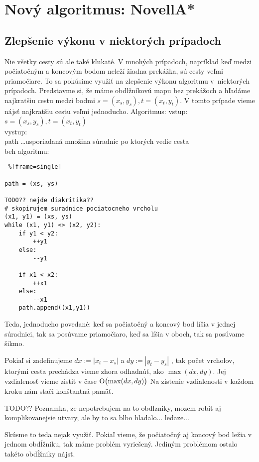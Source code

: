 \chapter{Nový algoritmus: NovellA*}

\section{Zlepšenie výkonu v niektorých prípadoch}
Nie všetky cesty sú ale také kľukaté. V mnohých prípadoch, napríklad keď medzi počiatočným a koncovým bodom neleží žiadna prekážka, 
sú cesty veľmi priamočiare. To sa pokúsime využiť na zlepšenie výkonu algoritmu v~niektorých prípadoch. 
Predstavme si, že máme obdlžníkovú mapu bez prekážoch a hľadáme najkratšiu cestu medzi bodmi $s=(x_s,y_s), t=(x_t,y_t)$.
V tomto prípade vieme nájsť najkratšiu cestu veľmi jednoducho.
Algoritmus:
vstup: \\
$s=(x_s,y_s), t=(x_t,y_t)$ \\
vystup:\\
path \dots usporiadaná množina súradníc po ktorých vedie cesta\\
beh algoritmu:\\


\lstset{language=Python}          
\begin{lstlisting} %[frame=single]  

path = (xs, ys)

TODO?? nejde diakritika??
# skopirujem suradnice pociatocneho vrcholu 
(x1, y1) = (xs, ys) 
while (x1, y1) <> (x2, y2):
	if y1 < y2:
		++y1
	else:
		--y1

	if x1 < x2:
		++x1
	else:
		--x1
	path.append((x1,y1))
\end{lstlisting}

Teda, jednoducho povedané: keď sa počiatočný a koncový bod líšia v jednej súradnici, tak sa posúvame priamočiaro,
keď sa líšia v oboch, tak sa posúvame šikmo.


Pokiaľ si zadefinujeme 
$ dx := |x_t - x_s|$ 
a
$ dy :=|y_t - y_s| $
 , tak počet vrcholov,
ktorými cesta prechádza vieme zhora odhadnúť, ako $\max(dx, dy)$. Jej vzdialenosť vieme zistiť v čase  $\operatorname{O}\bigl(\max(dx, dy)\bigr)$
Na zistenie vzdialenosti v každom kroku nám stači konštantná pamäť.

TODO?? Poznamka, ze nepotrebujem na to obdlzniky, mozem robit aj komplikovanejsie utvary, ale by to sa blbo hladalo... ledaze...

Skúsme to teda nejak využiť. Pokiaľ vieme, že počiatočný aj koncový bod ležia v jednom obdĺžniku, tak máme problém vyriešený. 
Jediným problémom ostalo takéto obdĺžniky nájsť. 


